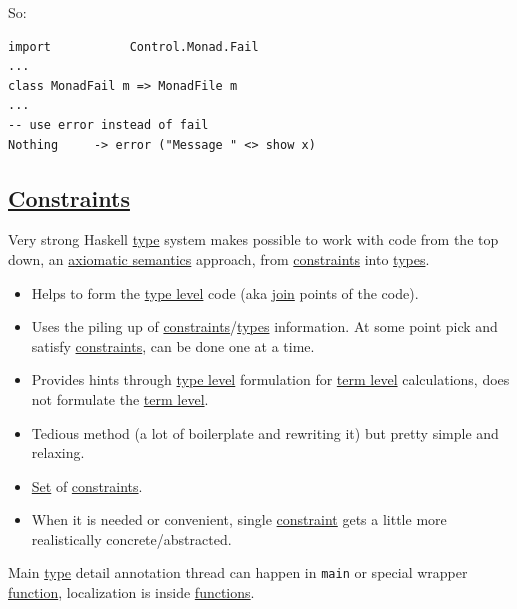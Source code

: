 \documentclass[11pt]{article}
\begin{document}
So:\\
\begin{verbatim}
import           Control.Monad.Fail
...
class MonadFail m => MonadFile m
...
-- use error instead of fail
Nothing     -> error ("Message " <> show x)
\end{verbatim}

\subsection{\hyperref[org76311a9]{Constraints}}
\label{sec:org5369877}

Very strong Haskell \hyperref[org4fbaeb8]{type} system makes possible to work with code from the top down, an \hyperref[org382e9d6]{axiomatic semantics} approach, from \hyperref[org76311a9]{constraints} into \hyperref[org3927fd9]{types}.\\

\begin{itemize}
\item Helps to form the \hyperref[org01e5da3]{type level} code (aka \hyperref[orgcf84bcb]{join} points of the code).\\
\item Uses the piling up of \hyperref[org76311a9]{constraints}/\hyperref[org3927fd9]{types} information. At some point pick and satisfy \hyperref[org76311a9]{constraints}, can be done one at a time.\\
\item Provides hints through \hyperref[org01e5da3]{type level} formulation for \hyperref[org3e856cf]{term level} calculations, does not formulate the \hyperref[org3e856cf]{term level}.\\
\item Tedious method (a lot of boilerplate and rewriting it) but pretty simple and relaxing.\\

\item \hyperref[orgbed80ba]{Set} of \hyperref[org76311a9]{constraints}.\\

\item When it is needed or convenient, single \hyperref[org7bec652]{constraint} gets a little more realistically concrete/abstracted.\\
\end{itemize}

Main \hyperref[org4fbaeb8]{type} detail annotation thread can happen in \texttt{main} or special wrapper \hyperref[orgeb5cddb]{function}, localization is inside \hyperref[org66c5288]{functions}.\\
\end{document}
